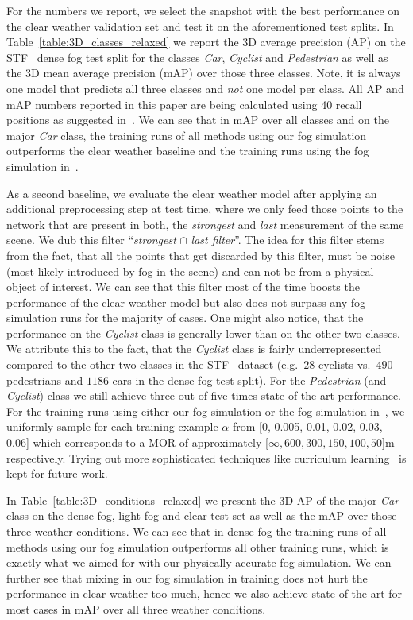 \documentclass[10pt,twocolumn,letterpaper]{article}
\begin{document}
For the numbers we report, we select the snapshot with the best performance on the clear weather validation set and test it on the aforementioned test splits. In Table~\ref{table:3D_classes_relaxed} we report the 3D average precision (AP) on the STF~\cite{STF} dense fog test split for the classes \textit{Car}, \textit{Cyclist} and \textit{Pedestrian} as well as the 3D mean average precision (mAP) over those three classes. Note, it is always one model that predicts all three classes and \textit{not} one model per class. All AP and mAP numbers reported in this paper are being calculated using 40 recall positions as suggested in~\cite{Simonelli_2019_ICCV}. We can see that in mAP over all classes and on the major \textit{Car} class, the training runs of all methods using our fog simulation outperforms the clear weather baseline and the training runs using the fog simulation in~\cite{STF}. 

As a second baseline, we evaluate the clear weather model after applying an additional preprocessing step at test time, where we only feed those points to the network that are present in both, the \textit{strongest} and \textit{last} measurement of the same scene. We dub this filter ``\textit{strongest} $\cap$ \textit{last filter}''. The idea for this filter stems from the fact, that all the points that get discarded by this filter, must be noise (most likely introduced by fog in the scene) and can not be from a physical object of interest. We can see that this filter most of the time boosts the performance of the clear weather model but also does not surpass any fog simulation runs for the majority of cases. One might also notice, that the performance on the \textit{Cyclist} class is generally lower than on the other two classes.  We attribute this to the fact, that the \textit{Cyclist} class is fairly underrepresented compared to the other two classes in the STF~\cite{STF} dataset (e.g.\ $28$ cyclists vs.\ $490$ pedestrians and $1186$ cars in the dense fog test split). For the \textit{Pedestrian} (and \textit{Cyclist}) class we still achieve three out of five times state-of-the-art performance. For the training runs using either our fog simulation or the fog simulation in~\cite{STF}, we uniformly sample for each training example $\alpha$ from [0, 0.005, 0.01, 0.02, 0.03, 0.06] which corresponds to a MOR of approximately [$\infty, 600, 300, 150, 100, 50$]m respectively. Trying out more sophisticated techniques like curriculum learning~\cite{Curriculum} is kept for future work.

In Table~\ref{table:3D_conditions_relaxed} we present the 3D AP of the major \textit{Car} class on the dense fog, light fog and clear test set as well as the mAP over those three weather conditions. We can see that in dense fog the training runs of all methods using our fog simulation outperforms all other training runs, which is exactly what we aimed for with our physically accurate fog simulation. We can further see that mixing in our fog simulation in training does not hurt the performance in clear weather too much, hence we also achieve state-of-the-art for most cases in mAP over all three weather conditions. 
\end{document}
